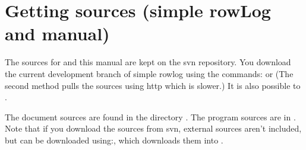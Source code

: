 \chapter{Getting sources (simple rowLog and manual)}
The sources for \srl and this manual are kept on the \srl svn repository. You download the current development branch of simple rowlog using the commands:
or
(The second method pulls the sources using http which is slower.)
It is also possible to .


The document sources are found in the directory . The program sources are in . Note that if you download the sources from svn, external sources aren't included, but can be downloaded using:, which downloads them into .